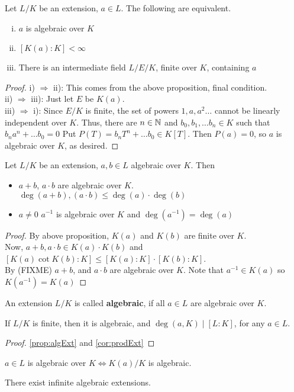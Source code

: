 \begin{prop}\label{prop:algExt}
    Let $L / K$ be an extension, $a \in L$. The following are equivalent.
    \begin{enumerate}[i)]
        \item $a$ is algebraic over $K$
        \item $[K(a) : K] < \infty$
        \item There is an intermediate field $L/E/K$, finite over $K$, containing $a$
    \end{enumerate}
\end{prop}
\begin{proof}
    i) $\Rightarrow$ ii): This comes from the above proposition, final condition. \\
    ii) $\Rightarrow$ iii): Just let $E$ be $K(a)$. \\
    iii) $\Rightarrow$ i): Since $E / K$ is finite, the set of powers $1,a,a^2 \dots$ cannot
    be linearly independent over $K$. Thus, there are $n \in \mathbb{N}$ and $b_0, b_{1}, \dots b_{n} \in K$
    such that $b_na^n + \dots b_0 = 0$ Put $P(T) = b_nT^n + \dots b_0 \in K[T]$. Then $P(a) = 0$,
    so $a$ is algebraic over $K$, as desired.
\end{proof}

\begin{cor}
    Let $L / K$ be an extension, $a,b \in L$ algebraic over $K$. Then
    \begin{itemize}
        \item $a + b$, $a \cdot b$ are algebraic over $K$. $\deg(a + b), (a \cdot b) \leq \deg(a)
        \cdot \deg(b)$
        \item $a \neq 0$ $a^{-1}$ is algebraic over $K$ and $\deg(a^{-1}) = \deg(a)$
    \end{itemize}
\end{cor}

\begin{proof}
    By above proposition, $K(a)$ and $K(b)$ are finite over $K$. \\
    Now, $a + b, a \cdot b \in K(a)\cdot K(b)$ and $[K(a) \cot K(b) : K] \leq [K(a) : K]
    \cdot [K(b): K]$. \\
    By (FIXME) $a + b$, and $a \cdot b$ are algebraic over $K$. Note that $a^{-1} \in K(a)$
    so $K(a^{-1}) = K(a)$
\end{proof}
\begin{defn}
    An extension $L / K$ is called \textbf{algebraic}, if all $a \in L$ are algebraic
    over $K$.
\end{defn}
\begin{cor}
    If $L / K$ is finite, then it is algebraic, and $\deg(a,K) \mid [L:K]$, for
    any $a \in L$.
\end{cor}
\begin{proof}
    \ref{prop:algExt} and \ref{cor:prodExt} 
\end{proof}

\begin{rmk}
    $a \in L$ is algebraic over $K \iff K(a) / K$ is algebraic.
\end{rmk}
\begin{rmk}
    There exist infinite algebraic extensions.
\end{rmk}
